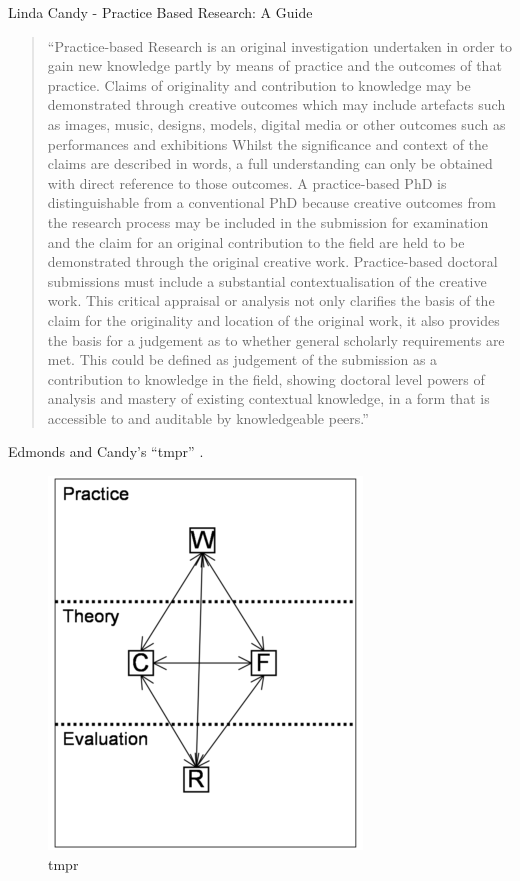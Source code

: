 Linda Candy - Practice Based Research: A Guide
\begin{quote}
  ``Practice-based Research is an original investigation undertaken in order to gain new knowledge partly by means of practice and the outcomes of that practice. Claims of originality and contribution to knowledge may be demonstrated through creative outcomes which may include artefacts such as images, music, designs, models, digital media or other outcomes such as performances and exhibitions Whilst the significance and context of the claims are described in words, a full understanding can only be obtained with direct reference to those outcomes. A practice-based PhD is distinguishable from a conventional PhD because creative outcomes from the research process may be included in the submission for examination and the claim for an original contribution to the field are held to be demonstrated through the original creative work. Practice-based doctoral submissions must include a substantial contextualisation of the creative work. This critical appraisal or analysis not only clarifies the basis of the claim for the originality and location of the original work, it also provides the basis for a judgement as to whether general scholarly requirements are met. This could be defined as judgement of the submission as a contribution to knowledge in the field, showing doctoral level powers of analysis and mastery of existing contextual knowledge, in a form that is accessible to and auditable by knowledgeable peers.'' \autocite{Candy2006}
\end{quote}

Edmonds and Candy's ``\gls{tmpr}'' \autocite{Edmonds2010}.

\begin{figure}[htb] %
  \centering
  \includegraphics{images/tmpr}
  \caption[tmpr]{tmpr}
\label{fig:tmpr}
\end{figure}

